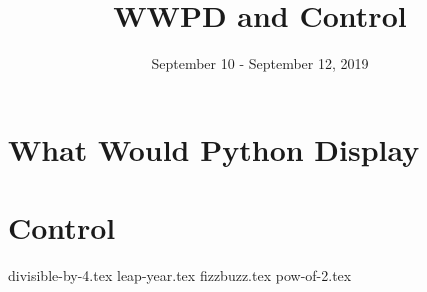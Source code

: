 \documentclass{exam}
\title{WWPD and Control}
\date{September 10 - September 12, 2019}
\begin{document}
\maketitle

\section{What Would Python Display}
\begin{questions}

\end{questions}

\section{Control}
\begin{questions}
{divisible-by-4.tex}
{leap-year.tex}
{fizzbuzz.tex}
{pow-of-2.tex}
\end{questions}
\end{document}
